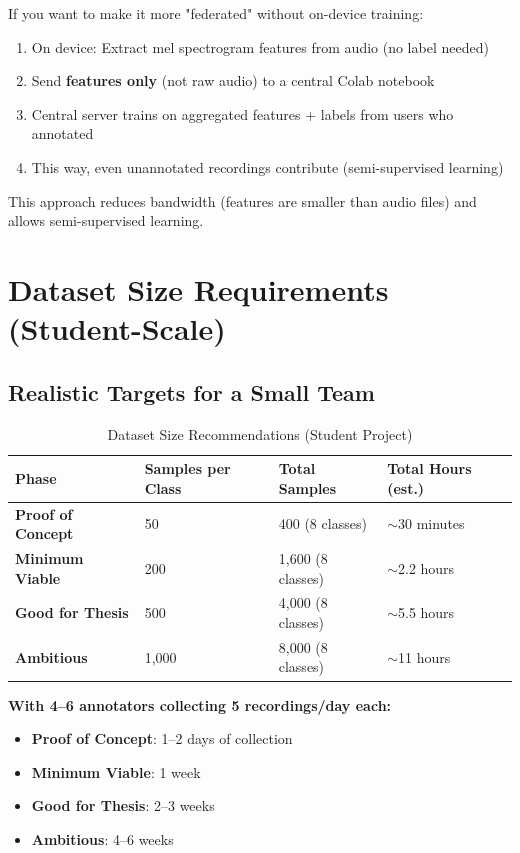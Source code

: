 \documentclass[11pt,a4paper]{article}
\begin{document}
If you want to make it more "federated" without on-device training:

\begin{enumerate}[leftmargin=*,noitemsep]
    \item On device: Extract mel spectrogram features from audio (no label needed)
    \item Send \textbf{features only} (not raw audio) to a central Colab notebook
    \item Central server trains on aggregated features + labels from users who annotated
    \item This way, even unannotated recordings contribute (semi-supervised learning)
\end{enumerate}

This approach reduces bandwidth (features are smaller than audio files) and allows semi-supervised learning.

\section{Dataset Size Requirements (Student-Scale)}

\subsection{Realistic Targets for a Small Team}

\begin{table}[h]
\centering
\caption{Dataset Size Recommendations (Student Project)}
\begin{tabular}{@{}p{4cm}p{3cm}p{3cm}p{3cm}@{}}
\toprule
\textbf{Phase} & \textbf{Samples per Class} & \textbf{Total Samples} & \textbf{Total Hours (est.)} \\
\midrule
\textbf{Proof of Concept} & 50 & 400 (8 classes) & $\sim$30 minutes \\
\textbf{Minimum Viable} & 200 & 1,600 (8 classes) & $\sim$2.2 hours \\
\textbf{Good for Thesis} & 500 & 4,000 (8 classes) & $\sim$5.5 hours \\
\textbf{Ambitious} & 1,000 & 8,000 (8 classes) & $\sim$11 hours \\
\bottomrule
\end{tabular}
\end{table}

\textbf{With 4--6 annotators collecting 5 recordings/day each:}
\begin{itemize}[leftmargin=*,noitemsep]
    \item \textbf{Proof of Concept}: 1--2 days of collection
    \item \textbf{Minimum Viable}: 1 week
    \item \textbf{Good for Thesis}: 2--3 weeks
    \item \textbf{Ambitious}: 4--6 weeks
\end{itemize}
\end{document}
